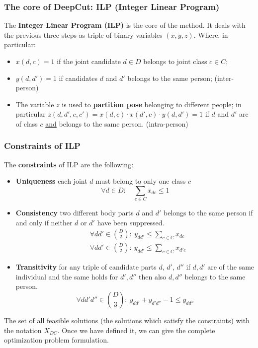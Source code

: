 \subsubsection{The core of DeepCut: ILP (Integer Linear Program)}
The \textbf{Integer Linear Program (ILP)} is the core of the method. It deals with the previous three steps as triple of binary variables $(x,y,z)$. Where, in particular:
\begin{itemize}
    \itemsep-0.2em
    \item $x(d,c)=1$ if the joint candidate $d\in{D}$ belongs to joint class $c\in{C}$; 
    \item $y(d,d')=1$ if candidates $d$ and $d'$ belongs to the same person; (inter-person)
    \item The variable $z$ is used to \textbf{partition pose} belonging to different people; in particular $z(d,d',c,c')=x(d,c)\cdot{x(d',c)}\cdot{y(d,d')}=1$ if $d$ and $d'$ are of class $c$ \underline{and} belongs to the same person.  (intra-person)
\end{itemize}

\subsubsection*{\textsf{Constraints of ILP}}
The \textbf{constraints} of ILP are the  following:
\begin{itemize}
    \itemsep-0.3em
    \item \textbf{Uniqueness} each joint $d$ must belong to only one class $c$
    \begin{equation*}
        \forall{d}\in{D}: \quad \sum_{c\in{C}} {x_{dc}}\le{1}
    \end{equation*}
    \item \textbf{Consistency} two different body parts  $d$ and $d'$ belongs to the same person if and only if neither $d$ or $d'$ have been suppressed.
    \begin{align*}
        &\forall{dd'}\in\binom{D}{2}: \ y_{dd'} \le \sum_{c\in{C}} x_{dc}\\
        &\forall{dd'}\in\binom{D}{2}: \ y_{dd'} \le \sum_{c\in{C}} x_{d'c}
    \end{align*}
    \item \textbf{Transitivity} for any triple of candidate parts $d$, $d'$, $d''$ if $d,d'$ are of the same individual and the same holds for $d',d''$ then also $d,d''$ belongs to the same person.
    \begin{equation*}
        \forall{dd'd''}\in\binom{D}{3}: \ y_{dd'}+y_{d'd''}-1\le{y_{dd''}}
    \end{equation*}
\end{itemize}
The set of all feasible solutions (the solutions which satisfy the constraints) with the notation $X_{DC}$. Once we have defined it, we can give the complete optimization problem formulation. 


